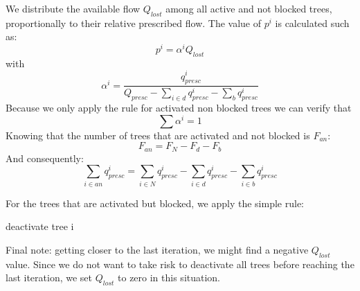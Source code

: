\documentclass[a4paper, 11pt]{article} %
\begin{document}
We distribute the available flow $Q_{lost}$ among all active and not blocked trees, proportionally to their relative prescribed flow.
The value of $p^i$ is calculated such as:
\begin{equation}
p^i = \alpha^iQ_{lost}
\end{equation}
with 
\begin{equation}
\alpha^i = \frac{q_{presc}^i}{Q_{presc} - \sum\limits_{i \in d}q_{presc}^i - \sum\limits_{b}q_{presc}^i}
\end{equation}
Because we only apply the rule for activated non blocked trees  we can verify that 
\begin{equation}
\sum \alpha^i = 1
\end{equation}
Knowing that the number of trees that are activated and not blocked is $F_{an}$:
\begin{equation}
F_{an} = F_N - F_d - F_b
\end{equation}
And consequently:
\begin{equation}
\sum\limits_{i \in an} q_{presc}^i =  \sum\limits_{i \in N}q_{presc}^i - \sum\limits_{i \in d}q_{presc}^i - \sum\limits_{i \in b}q_{presc}^i
\end{equation}



For the trees that are activated but blocked, we apply the simple rule: 
\begin{algorithm}
\begin{algorithmic} 
\STATE deactivate tree i
\ENDIF
\end{algorithmic} 
\end{algorithm}

Final note: getting closer to the last iteration, we might find a negative $Q_{lost}$ value. Since we do not want to take risk to deactivate all trees before reaching the last iteration, we set $Q_{lost}$ to zero in this situation.
\end{document}
